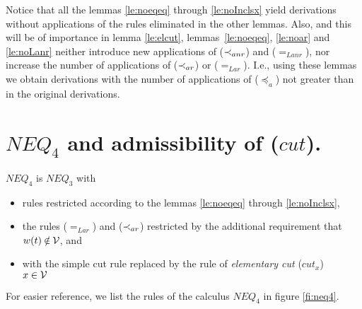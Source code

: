 %
\begin{REMARK}\label{re:noincrease}
Notice that all the lemmas \ref{le:noeqeq} through \ref{le:noInclsx} 
yield derivations without applications of the rules eliminated in the other
lemmas. 
Also, and this will be of importance in lemma \ref{le:elcut}, 
lemmas~\ref{le:noeqeq}, \ref{le:noar} and \ref{le:noLanr}
neither introduce new applications of ($\mathbin{\prec}_{anr}$) and ($=_{Lanr}$), nor
increase the number of applications of ($\mathbin{\prec}_{ar}$) or ($=_{Lar}$).
I.e., using these lemmas we obtain derivations with the number
of applications of ($\preceq_a$) not greater than in the original derivations.
\end{REMARK}

\section{$NEQ_4$ and admissibility of ($cut$).}
%
\begin{DEFINITION}\label{de:neq4}
$NEQ_4$ is $NEQ_3$ with 
\begin{itemize}\MyLPar
\item rules restricted
according to the lemmas \ref{le:noeqeq} through \ref{le:noInclsx},
\item the rules ($=_{Lar}$) and ($\mathbin{\prec}_{ar}$) restricted by the additional requirement that 
$w(t)\not\in\Vars$, and
\item
with the simple cut rule  replaced by the rule of {\em elementary cut}
 ($cut_x$)\ \
\ $x\in{\cal V}$ \label{ru:cutx} 
\end{itemize}
\end{DEFINITION}
%
\noindent
For easier reference, we list the rules of the calculus $NEQ_4$ in figure
\ref{fi:neq4}.

